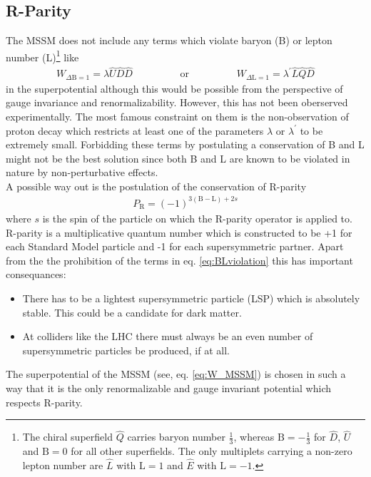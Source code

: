 \subsection{R-Parity}
The MSSM does not include any terms which violate baryon (B) or lepton number (L)\footnote{The chiral superfield $\hat{Q}$ carries baryon number $\frac{1}{3}$, whereas $\mathrm{B} = -\frac{1}{3}$ for $\hat{D}$, $\hat{U}$ and $\mathrm{B} = 0$ for all other superfields. The only multiplets carrying a non-zero lepton number are $\hat{L}$ with $\mathrm{L} = 1$ and $\hat{E}$ with $\mathrm{L} = -1$.} like 
\begin{align}
W_{\Delta \mathrm{B}=1} = \lambda \hat{U}\hat{D}\hat{D} \hspace{2cm}\mathrm{or}\hspace{2cm} W_{\Delta \mathrm{L}=1} = \lambda^\prime \hat{L}\hat{Q}\hat{D}\label{eq:BLviolation}
\end{align}
in the superpotential although this would be possible from the perspective of gauge invariance and renormalizability. However, this has not been oberserved experimentally. The most famous constraint on them is the non-observation of proton decay which restricts at least one of the parameters $\lambda$ or $\lambda^\prime$ to be extremely small\cite{Martin:1997ns}. Forbidding these terms by postulating a conservation of B and L might not be the best solution since both B and L are known to be violated in nature by non-perturbative effects\cite{'tHooft:1976up}.\\
A possible way out is the postulation of the conservation of R-parity
\begin{align}
P_\mathrm{R} = (-1)^{3(\mathrm{B}-\mathrm{L})+2s}
\end{align}
where $s$ is the spin of the particle on which the R-parity operator is applied to. R-parity is a multiplicative quantum number which is constructed to be +1 for each Standard Model particle and -1 for each supersymmetric partner. Apart from the the prohibition of the terms in eq. \ref{eq:BLviolation} this has important consequances:
\begin{itemize}
\item There has to be a lightest supersymmetric particle (LSP) which is absolutely stable. This could be a candidate for dark matter.
\item At colliders like the LHC there must always be an even number of supersymmetric particles be produced, if at all.
\end{itemize}
The superpotential of the MSSM (see, eq. \ref{eq:W_MSSM}) is chosen in such a way that it is the only renormalizable and gauge invariant potential which respects R-parity.
